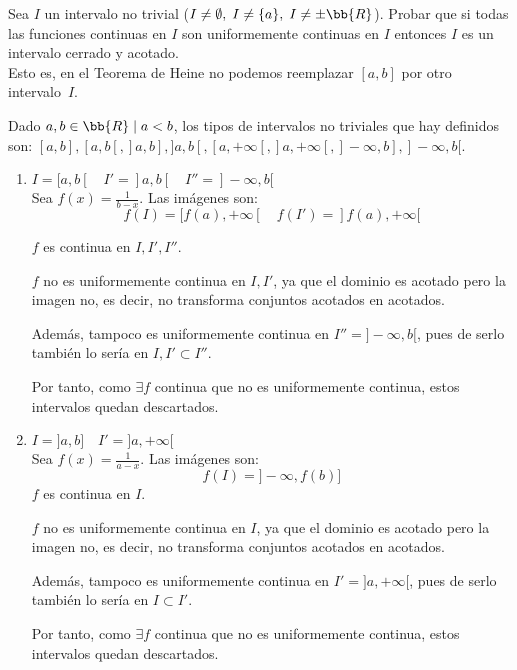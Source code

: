 \begin{ejercicio}
    Sea $I$ un intervalo no trivial ($I\neq \emptyset,\;I\neq \{a\},\;I\neq \pm \bb{R}$). Probar que si todas las funciones continuas en $I$ son uniformemente continuas en $I$ entonces $I$ es un intervalo cerrado y acotado.\\

    Esto es, en el Teorema de Heine no podemos reemplazar $[a,b]$ por otro intervalo~$I$. 
    
    Dado $a,b\in \bb{R}\mid a<b$, los tipos de intervalos no triviales que hay definidos son: $[a,b], [a,b[, ]a,b], ]a,b[, [a, +\infty[, ]a,+\infty[, ]-\infty, b], ]-\infty, b[$.
    \begin{enumerate}
        \item $I=[a, b[ \quad I'=]a, b[ \quad I''=]-\infty,b[$\\
        Sea $f(x)=\frac{1}{b-x}$. Las imágenes son:
        \begin{equation*}
            f(I)=[f(a),+\infty[ \quad f(I')=]f(a),+\infty[
        \end{equation*}

        $f$ es continua en $I,I',I''$.
        
        $f$ no es uniformemente continua en $I,I'$, ya que el dominio es acotado pero la imagen no, es decir, no transforma conjuntos acotados en acotados.

        Además, tampoco es uniformemente continua en $I''=]-\infty,b[$, pues de serlo también lo sería en $I,I'\subset I''$.

        Por tanto, como $\exists f$ continua que no es uniformemente continua, estos intervalos quedan descartados.

        \item $I=]a, b] \quad I'=]a, +\infty[$\\
        Sea $f(x)=\frac{1}{a-x}$. Las imágenes son:
        \begin{equation*}
            f(I)=]-\infty, f(b)]
        \end{equation*}
        $f$ es continua en $I$.
        
        $f$ no es uniformemente continua en $I$, ya que el dominio es acotado pero la imagen no, es decir, no transforma conjuntos acotados en acotados.

        Además, tampoco es uniformemente continua en $I'=]a,+\infty[$, pues de serlo también lo sería en $I\subset I'$.

        Por tanto, como $\exists f$ continua que no es uniformemente continua, estos intervalos quedan descartados.


\end{enumerate}
\end{ejercicio}
